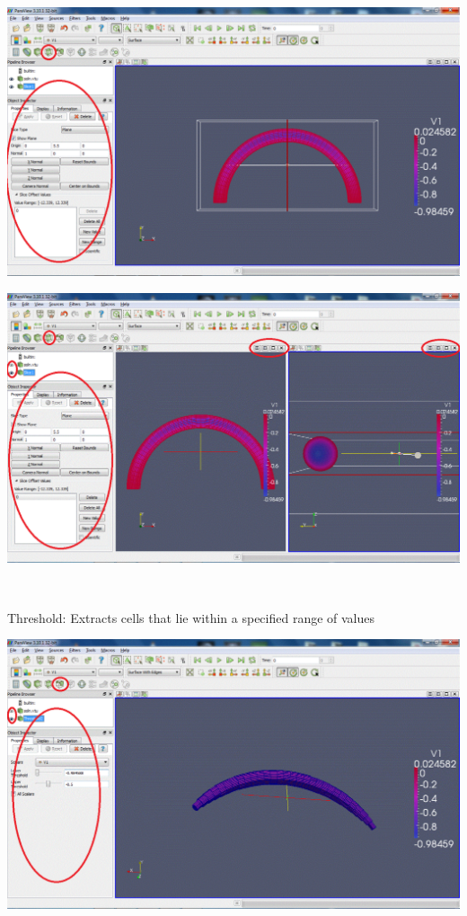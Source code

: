 \begin{DoxyEnumerate}
\begin{DoxyImageNoCaption}
  \mbox{\includegraphics[width=\textwidth]{paraview10}}
\end{DoxyImageNoCaption}
  
\begin{DoxyImageNoCaption}
  \mbox{\includegraphics[width=\textwidth]{paraview11}}
\end{DoxyImageNoCaption}
 ~\newline

\item {\ttfamily Threshold\+:} Extracts cells that lie within a specified range of values ~\newline
 
\begin{DoxyImageNoCaption}
  \mbox{\includegraphics[width=\textwidth]{paraview12}}
\end{DoxyImageNoCaption}


\end{DoxyEnumerate}
